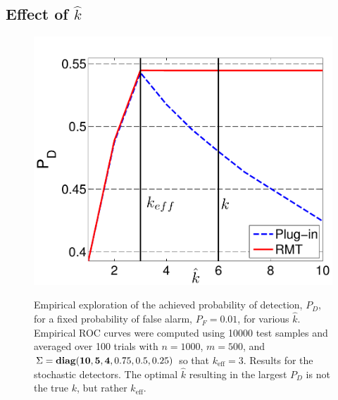 \subsection{Effect of $\widehat{k}$}
\begin{figure}
\centering
\includegraphics[width=\figwidth]{ieee_msd/figures/asend7.pdf}
\label{fig:stoch_khat}
\vspace{-0.1in}
\caption{Empirical exploration of the achieved probability of detection, $P_D$, for a
  fixed probability of false alarm, $P_F=0.01$, for various $\widehat{k}$. Empirical ROC
  curves were computed using 10000 test samples and averaged over 100 trials with
  $n=1000$, $m=500$, and $\Sigma = \mathop{\bf diag}({\bf{10,5,4}},0.75,0.5,0.25)$ so that
  $k_{\text{eff}}=3$. Results for the stochastic detectors. The optimal $\widehat{k}$ resulting in the largest $P_D$ is not the true $k$, but rather $k_\text{eff}$.} %
\label{fig:khat_graphs}
\vspace{-0.3in}
\end{figure}

